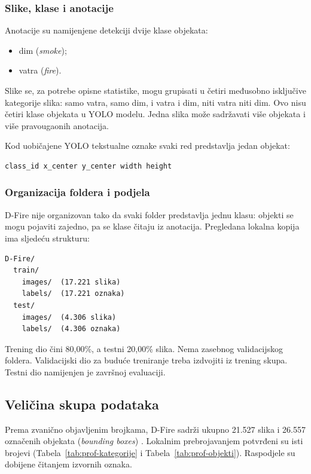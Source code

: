 \subsubsection{Slike, klase i anotacije}
Anotacije su namijenjene detekciji dvije klase objekata:
\begin{itemize}
  \item dim (\emph{smoke});
  \item vatra (\emph{fire}).
\end{itemize}
Slike se, za potrebe opisne statistike, mogu grupisati u četiri međusobno isključive kategorije slika: samo vatra, samo dim, i vatra i dim, niti vatra niti dim. Ovo nisu četiri klase objekata u YOLO modelu. Jedna slika može sadržavati više objekata i više pravougaonih anotacija.

Kod uobičajene YOLO tekstualne oznake svaki red predstavlja jedan objekat:
\begin{verbatim}
class_id x_center y_center width height
\end{verbatim}

\subsubsection{Organizacija foldera i podjela}
D-Fire nije organizovan tako da svaki folder predstavlja jednu klasu: objekti se mogu pojaviti zajedno, pa se klase čitaju iz anotacija. Pregledana lokalna kopija ima sljedeću strukturu:
\begin{verbatim}
D-Fire/
  train/
    images/  (17.221 slika)
    labels/  (17.221 oznaka)
  test/
    images/  (4.306 slika)
    labels/  (4.306 oznaka)
\end{verbatim}
Trening dio čini 80,00\%, a testni 20,00\% slika. Nema zasebnog validacijskog foldera. Validacijski dio za buduće treniranje treba izdvojiti iz trening skupa. Testni dio namijenjen je završnoj evaluaciji.

\subsection{Veličina skupa podataka}
Prema zvanično objavljenim brojkama, D-Fire sadrži ukupno 21.527 slika i 26.557 označenih objekata (\emph{bounding boxes}) \cite{dfire}. Lokalnim prebrojavanjem potvrđeni su isti brojevi (Tabela~\ref{tab:prof-kategorije} i Tabela~\ref{tab:prof-objekti}). Raspodjele su dobijene čitanjem izvornih oznaka.

